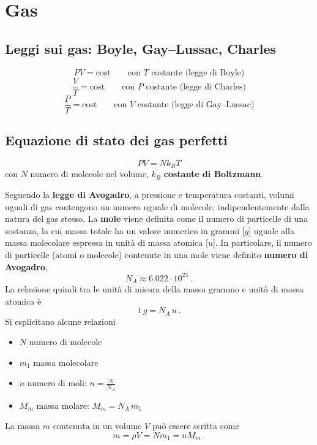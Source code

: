\section{Gas}
\subsection{Leggi sui gas: Boyle, Gay--Lussac, Charles}
\begin{equation}
    P V = \text{cost} \qquad \text{con $T$ costante (legge di Boyle)}
\end{equation}
\begin{equation}
    \dfrac{V}{T} = \text{cost} \qquad \text{con $P$ costante (legge di Charles)}
\end{equation}
\begin{equation}
    \dfrac{P}{T} = \text{cost} \qquad \text{con $V$ costante (legge di Gay--Lussac)}
\end{equation}
\subsection{Equazione di stato dei gas perfetti}
\begin{equation}
    P V = N k_B T
\end{equation}
con $N$ numero di molecole nel volume, $k_B$ \textbf{costante di Boltzmann}.

Seguendo la \textbf{legge di Avogadro}, a pressione e temperatura costanti, volumi uguali di gas contengono un numero uguale di molecole, indipendentemente dalla natura del gas stesso.
La \textbf{mole} viene definita come il numero di particelle di una sostanza, la cui massa totale ha un valore numerico in grammi [$g$] uguale alla massa molecolare espressa in unità di massa atomica [$u$].
In particolare, il numero di particelle (atomi o molecole) contenute in una mole viene definito \textbf{numero di Avogadro},
\begin{equation}
    N_A \approx 6.022 \cdot 10^{23} \ .
\end{equation}
La relazione quindi tra le unità di misura della massa grammo e unità di massa atomica è
\begin{equation}
    1 \, g = N_A \, u \ .
\end{equation}
%
Si esplicitano alcune relazioni
\begin{itemize}
    \item $N$ numero di molecole
    \item $m_1$ massa molecolare
    \item $n$ numero di moli: $n = \frac{N}{N_A}$
    \item $M_m$ massa molare: $M_m = N_A \, m_1$
\end{itemize}
La massa $m$ contenuta in un volume $V$ può essere scritta come
\begin{equation}
    m = \rho V = N m_1 = n M_m \ .
\end{equation}

